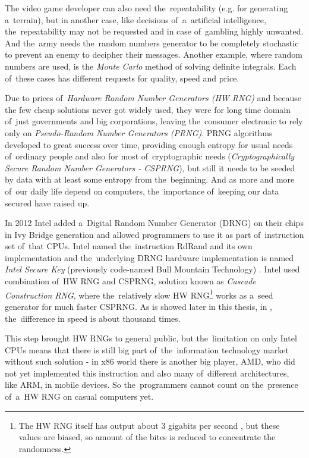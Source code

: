 \par{
The video game developer can also need the~repeatability (e.g. for generating 
a~terrain), but in another case, like decisions of~a~artificial intelligence, 
the~repeatability may not be requested and in case of~gambling highly unwanted. 
And the~army needs the~random numbers generator to be completely stochastic 
to prevent an enemy to decipher their messages. Another example, where random 
numbers are used, is the {\em Monte Carlo} method of solving definite integrals. 
Each of~these cases has different requests for quality, speed and price.
}

\par{
Due to prices of~{\em Hardware Random Number Generators (HW RNG)} 
and because the few cheap solutions never got widely used, 
they were for long time domain of~just governments and big corporations,
leaving the~consumer electronic to rely only on {\em Pseudo-Random Number 
Generators (PRNG)}. PRNG algorithms developed to great success over time, 
providing enough entropy for usual needs of~ordinary people and also for most 
of~cryptographic needs ({\em Cryptographically Secure Random Number 
Generators - CSPRNG}), but still it needs to be seeded by data with at least 
some entropy from the~beginning. And as more and more of~our daily life 
depend on computers, the~importance of~keeping our data secured have 
raised up. 
}

\par{
In 2012\cite{IntelRdRandFindAbout} Intel added a~Digital Random Number 
Generator (DRNG) on their chips in Ivy Bridge generation
and allowed programmers to use it as part 
of~instruction set of~that CPUs. Intel named the~instruction RdRand and its own 
implementation and the~underlying DRNG hardware implementation is named 
{\em Intel Secure Key} (previously code-named Bull Mountain Technology)
\cite{IntelDRNGAnalysis}. Intel used combination of~HW RNG and CSPRNG, 
solution known as {\em Cascade Construction RNG}, where the~relatively slow 
HW RNG\footnote{The HW RNG itself has output about 3 gigabits per second
\cite{BehindRdRand}, but these values are biased, so amount of the bites 
is reduced to concentrate the randomness.} works as a~seed generator 
for much faster CSPRNG. As is showed later in this thesis, 
in , the~difference in speed 
is about thousand times.
}

\par{
This step brought HW RNGs to general public, but the~limitation on only Intel 
CPUs means that there is still big part of~the~information technology market 
without such solution - in x86 world there is another big player, 
AMD, who did not yet implemented this instruction and also many 
of~different architectures, like ARM, in mobile devices. 
So the~programmers cannot count on the~presence of~a~HW RNG 
on casual computers yet. 
}

